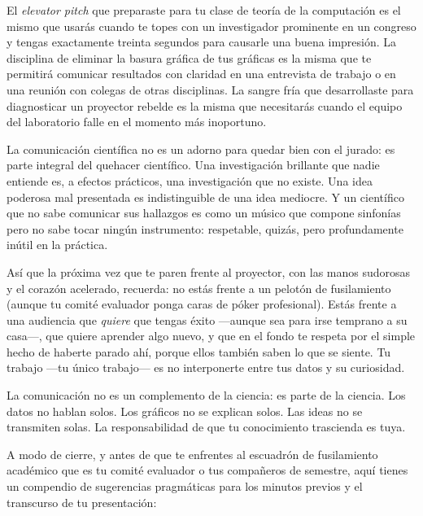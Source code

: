 El \emph{elevator pitch} que preparaste para tu clase de teoría de la computación es el mismo que usarás cuando te topes con un investigador prominente en un congreso y tengas exactamente treinta segundos para causarle una buena impresión.
La disciplina de eliminar la basura gráfica de tus gráficas es la misma que te permitirá comunicar resultados con claridad en una entrevista de trabajo o en una reunión con colegas de otras disciplinas.
La sangre fría que desarrollaste para diagnosticar un proyector rebelde es la misma que necesitarás cuando el equipo del laboratorio falle en el momento más inoportuno.

La comunicación científica no es un adorno para quedar bien con el jurado: es parte integral del quehacer científico.
Una investigación brillante que nadie entiende es, a efectos prácticos, una investigación que no existe.
Una idea poderosa mal presentada es indistinguible de una idea mediocre.
Y un científico que no sabe comunicar sus hallazgos es como un músico que compone sinfonías pero no sabe tocar ningún instrumento: respetable, quizás, pero profundamente inútil en la práctica.

Así que la próxima vez que te paren frente al proyector, con las manos sudorosas y el corazón acelerado, recuerda: no estás frente a un pelotón de fusilamiento (aunque tu comité evaluador ponga caras de póker profesional).
Estás frente a una audiencia que \emph{quiere} que tengas éxito —aunque sea para irse temprano a su casa—, que quiere aprender algo nuevo, y que en el fondo te respeta por el simple hecho de haberte parado ahí, porque ellos también saben lo que se siente.
Tu trabajo —tu único trabajo— es no interponerte entre tus datos y su curiosidad.

\begin{remember}
	\label{rem:final}
	La comunicación no es un complemento de la ciencia: es parte de la ciencia.
	Los datos no hablan solos.
	Los gráficos no se explican solos.
	Las ideas no se transmiten solas.
	La responsabilidad de que tu conocimiento trascienda es tuya.
\end{remember}

A modo de cierre, y antes de que te enfrentes al escuadrón de fusilamiento académico que es tu comité evaluador o tus compañeros de semestre, aquí tienes un compendio de sugerencias pragmáticas para los minutos previos y el transcurso de tu presentación:

